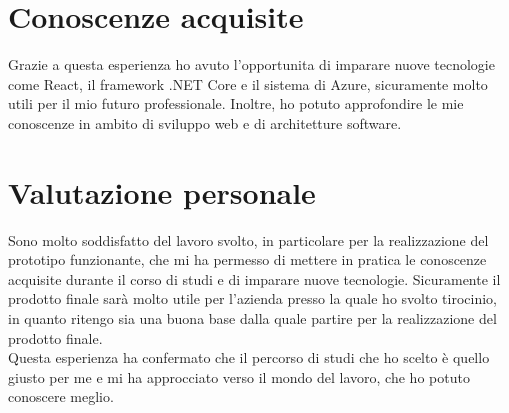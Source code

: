 \section{Conoscenze acquisite}
Grazie a questa esperienza ho avuto l'opportunita di imparare nuove tecnologie come React, il framework .NET Core e il sistema di Azure, sicuramente molto utili per il mio futuro professionale. Inoltre, ho potuto approfondire le mie conoscenze in ambito di sviluppo web e di architetture software.\\
\section{Valutazione personale}
Sono molto soddisfatto del lavoro svolto, in particolare per la realizzazione del prototipo funzionante, che mi ha permesso di mettere in pratica le conoscenze acquisite durante il corso di studi e di imparare nuove tecnologie. Sicuramente il prodotto finale sarà molto utile per l'azienda presso la quale ho svolto tirocinio, in quanto ritengo sia una buona base dalla quale partire per la realizzazione del prodotto finale.\\ 
Questa esperienza ha confermato che il percorso di studi che ho scelto è quello giusto per me e mi ha approcciato verso il mondo del lavoro, che ho potuto conoscere meglio.\\